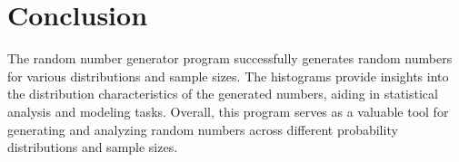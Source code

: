 \documentclass[12pt]{article}
\begin{document}
\section{Conclusion}

The random number generator program successfully generates random numbers for various distributions and sample sizes. The histograms provide insights into the distribution characteristics of the generated numbers, aiding in statistical analysis and modeling tasks.
Overall, this program serves as a valuable tool for generating and analyzing random numbers across different probability distributions and sample sizes.
\end{document}

